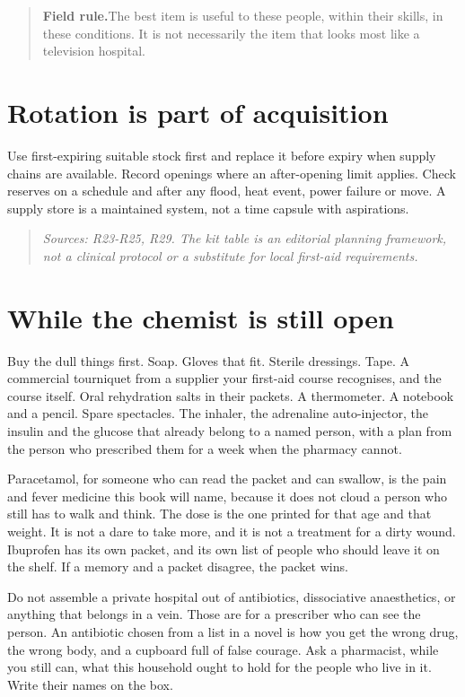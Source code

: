 \documentclass[10pt,openright]{book}
\newcommand{\fieldrule}[1]{\begin{quote}\textbf{Field rule.}\enspace #1\end{quote}}
\begin{document}
\fieldrule{The best item is useful to these people, within their skills, in these conditions. It is not necessarily the item that looks most like a television hospital.}
\section*{Rotation is part of acquisition}
Use first-expiring suitable stock first and replace it before expiry when supply chains are available. Record openings where an after-opening limit applies. Check reserves on a schedule and after any flood, heat event, power failure or move. A supply store is a maintained system, not a time capsule with aspirations.

\begin{quote}\emph{Sources: R23-R25, R29. The kit table is an editorial planning framework, not a clinical protocol or a substitute for local first-aid requirements.}\end{quote}
\section*{While the chemist is still open}
Buy the dull things first. Soap. Gloves that fit. Sterile dressings. Tape. A commercial tourniquet from a supplier your first-aid course recognises, and the course itself. Oral rehydration salts in their packets. A thermometer. A notebook and a pencil. Spare spectacles. The inhaler, the adrenaline auto-injector, the insulin and the glucose that already belong to a named person, with a plan from the person who prescribed them for a week when the pharmacy cannot.

Paracetamol, for someone who can read the packet and can swallow, is the pain and fever medicine this book will name, because it does not cloud a person who still has to walk and think. The dose is the one printed for that age and that weight. It is not a dare to take more, and it is not a treatment for a dirty wound. Ibuprofen has its own packet, and its own list of people who should leave it on the shelf. If a memory and a packet disagree, the packet wins.

Do not assemble a private hospital out of antibiotics, dissociative anaesthetics, or anything that belongs in a vein. Those are for a prescriber who can see the person. An antibiotic chosen from a list in a novel is how you get the wrong drug, the wrong body, and a cupboard full of false courage. Ask a pharmacist, while you still can, what this household ought to hold for the people who live in it. Write their names on the box.
\end{document}

